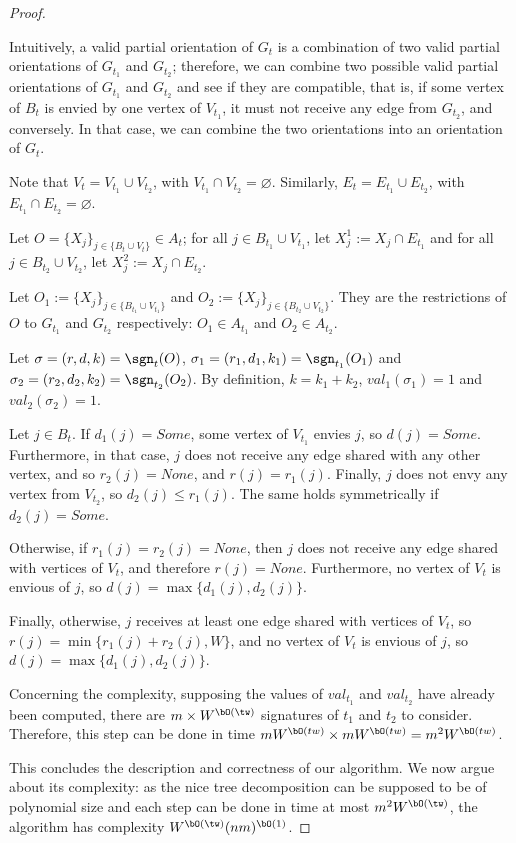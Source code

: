 \documentclass[11pt,letterpaper]{article}
\begin{document}
\begin{proof}
\begin{lemma}
    \end{lemma}
    Intuitively, a valid partial orientation of $G_t$ is a combination of two valid partial orientations of $G_{t_1}$ and $G_{t_2}$; therefore, we can combine two possible valid partial orientations of $G_{t_1}$ and $G_{t_2}$ and see if they are compatible, that is, if some vertex of $B_t$ is envied by one vertex of $V_{t_1}$, it must not receive any edge from $G_{t_2}$, and conversely. In that case, we can combine the two orientations into an orientation of $G_t$.

    \begin{nestedproof}
        Note that $V_t=V_{t_1}\cup V_{t_2}$, with $V_{t_1}\cap V_{t_2}=\varnothing$. Similarly, $E_t=E_{t_1}\cup E_{t_2}$, with $E_{t_1}\cap E_{t_2}=\varnothing$.

    Let $O=\{X_j\}_{j\in\{B_t\cup V_t\}}\in A_t$; for all $j\in B_{t_1}\cup V_{t_1}$, let $X_j^1:=X_j\cap E_{t_1}$ and
    for all $j\in B_{t_2}\cup V_{t_2}$, let $X_j^2:=X_j\cap E_{t_2}$.

    Let $O_1:=\{X_j\}_{j\in\{B_{t_1}\cup V_{t_1}\}} $ and $O_2:=\{X_j\}_{j\in\{B_{t_2}\cup V_{t_2}\}}$. They are the restrictions of $O$ to $G_{t_1}$ and $G_{t_2}$ respectively: $O_1\in A_{t_1}$ and $O_2\in A_{t_2}$.

    Let $\sigma=(r,d,k)=\sgn_t(O)$, $\sigma_1=(r_1,d_1,k_1)=\sgn_{t_1}(O_1)$ and $\sigma_2=(r_2,d_2,k_2)=\sgn_{t_2}(O_2)$. By definition, $k=k_1+k_2$, $val_1(\sigma_1)=1$ and $val_2(\sigma_2)=1$.

    Let $j\in B_t$. If $d_1(j)=Some$, some vertex of $V_{t_1}$ envies $j$, so $d(j)=Some$. Furthermore, in that case, $j$ does not receive any edge shared with any other vertex, and so $r_2(j)=None$, and $r(j)=r_1(j)$. Finally, $j$ does not envy any vertex from $V_{t_2}$, so $d_2(j)\leq r_1(j)$. The same holds symmetrically if $d_2(j)=Some$.

    Otherwise, if $r_1(j)=r_2(j)=None$, then $j$ does not receive any edge shared with vertices of $V_t$, and therefore $r(j)=None$. Furthermore, no vertex of $V_t$ is envious of $j$, so $d(j)=\max\{d_1(j),d_2(j)\}$.

    Finally, otherwise, $j$ receives at least one edge shared with vertices of $V_t$, so $r(j)=\min\{r_1(j)+r_2(j),W\}$, and no vertex of $V_t$ is envious of $j$, so $d(j)=\max\{d_1(j),d_2(j)\}$.
    \end{nestedproof}

    Concerning the complexity, supposing the values of $val_{t_1}$ and $val_{t_2}$ have already been computed, there are $m\times W^{\bO(\tw)}$ signatures of $t_1$ and $t_2$ to consider. Therefore, this step can be done in time $mW^{\bO(tw)}\times mW^{\bO(tw)}=m^2W^{\bO(tw)}$.
    \medskip

    This concludes the description and correctness of our algorithm. We now argue about its complexity: as the nice tree decomposition can be supposed to be of polynomial size and each step can be done in time at most $m^2W^{\bO(\tw)}$, the algorithm has complexity $W^{\bO(\tw)}(nm)^{\bO(1)}$.
\end{proof}
\end{document}
